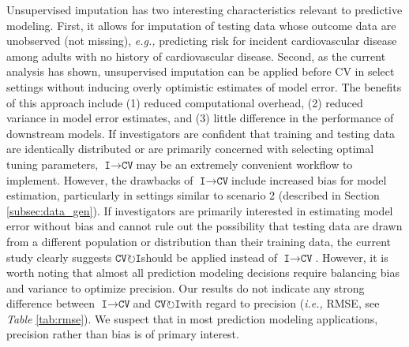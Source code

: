 \documentclass[AMA,STIX1COL,doublespace]{WileyNJD-v2}
\begin{document}
Unsupervised imputation has two interesting characteristics relevant to
predictive modeling. First, it allows for imputation of testing data
whose outcome data are unobserved (not missing),
\textit{e.g., }predicting risk for incident cardiovascular disease among
adults with no history of cardiovascular disease. Second, as the current
analysis has shown, unsupervised imputation can be applied before CV in
select settings without inducing overly optimistic estimates of model
error. The benefits of this approach include (1) reduced computational
overhead, (2) reduced variance in model error estimates, and (3) little
difference in the performance of downstream models. If investigators are
confident that training and testing data are identically distributed or
are primarily concerned with selecting optimal tuning parameters,
$\texttt{I}\!\!\rightarrow\!\texttt{CV}$\space may be an extremely
convenient workflow to implement. However, the drawbacks of
$\texttt{I}\!\!\rightarrow\!\texttt{CV}$\space include increased bias
for model estimation, particularly in settings similar to scenario 2
(described in Section \ref{subsec:data_gen}). If investigators are
primarily interested in estimating model error without bias and cannot
rule out the possibility that testing data are drawn from a different
population or distribution than their training data, the current study
clearly suggests
$\texttt{CV}\!\circlearrowright\!\texttt{I}$\space should be applied
instead of $\texttt{I}\!\!\rightarrow\!\texttt{CV}$. However, it is
worth noting that almost all prediction modeling decisions require
balancing bias and variance to optimize precision. Our results do not
indicate any strong difference between
$\texttt{I}\!\!\rightarrow\!\texttt{CV}$\space and
$\texttt{CV}\!\circlearrowright\!\texttt{I}$with regard to precision
(\textit{i.e., }RMSE, see \emph{Table} \ref{tab:rmse}). We suspect that
in most prediction modeling applications, precision rather than bias is
of primary interest.
\end{document}
